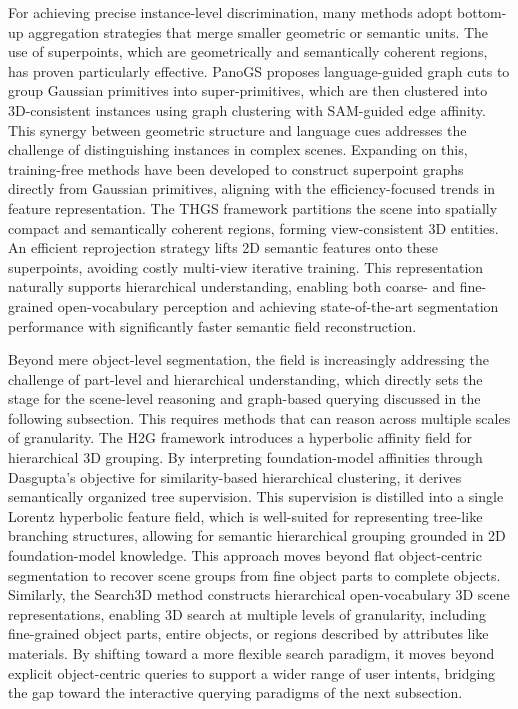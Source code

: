 \documentclass[11pt]{article}
\begin{document}
For achieving precise instance-level discrimination, many methods adopt bottom-up aggregation strategies that merge smaller geometric or semantic units. The use of superpoints, which are geometrically and semantically coherent regions, has proven particularly effective. PanoGS \cite{ref513} proposes language-guided graph cuts to group Gaussian primitives into super-primitives, which are then clustered into 3D-consistent instances using graph clustering with SAM-guided edge affinity. This synergy between geometric structure and language cues addresses the challenge of distinguishing instances in complex scenes. Expanding on this, training-free methods have been developed to construct superpoint graphs directly from Gaussian primitives, aligning with the efficiency-focused trends in feature representation. The THGS framework \cite{ref514} partitions the scene into spatially compact and semantically coherent regions, forming view-consistent 3D entities. An efficient reprojection strategy lifts 2D semantic features onto these superpoints, avoiding costly multi-view iterative training. This representation naturally supports hierarchical understanding, enabling both coarse- and fine-grained open-vocabulary perception and achieving state-of-the-art segmentation performance with significantly faster semantic field reconstruction.

Beyond mere object-level segmentation, the field is increasingly addressing the challenge of part-level and hierarchical understanding, which directly sets the stage for the scene-level reasoning and graph-based querying discussed in the following subsection. This requires methods that can reason across multiple scales of granularity. The H2G framework \cite{ref515} introduces a hyperbolic affinity field for hierarchical 3D grouping. By interpreting foundation-model affinities through Dasgupta's objective for similarity-based hierarchical clustering, it derives semantically organized tree supervision. This supervision is distilled into a single Lorentz hyperbolic feature field, which is well-suited for representing tree-like branching structures, allowing for semantic hierarchical grouping grounded in 2D foundation-model knowledge. This approach moves beyond flat object-centric segmentation to recover scene groups from fine object parts to complete objects. Similarly, the Search3D method \cite{ref516} constructs hierarchical open-vocabulary 3D scene representations, enabling 3D search at multiple levels of granularity, including fine-grained object parts, entire objects, or regions described by attributes like materials. By shifting toward a more flexible search paradigm, it moves beyond explicit object-centric queries to support a wider range of user intents, bridging the gap toward the interactive querying paradigms of the next subsection.
\end{document}
